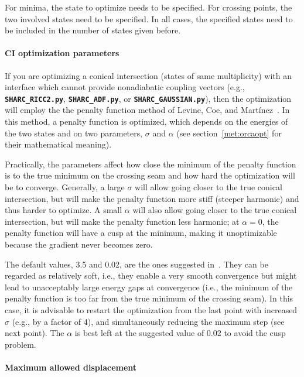 \documentclass[a4paper,10pt,DIV=15,openany]{scrbook}
\newcommand{\ttt}[1]{\textbf{\texttt{#1}}}
\begin{document}
For minima, the state to optimize needs to be specified.
For crossing points, the two involved states need to be specified.
In all cases, the specified states need to be included in the number of states given before.

\paragraph{CI optimization parameters}

If you are optimizing a conical intersection (states of same multiplicity) with an interface which cannot provide nonadiabatic coupling vectors (e.g., \ttt{SHARC\_RICC2.py}, \ttt{SHARC\_ADF.py}, or \ttt{SHARC\_GAUSSIAN.py}), then the optimization will employ the the penalty function method of Levine, Coe, and Mart\'inez~\cite{Levine2008JPCB}.
In this method, a penalty function is optimized, which depends on the energies of the two states and on two parameters, $\sigma$ and $\alpha$ (see section~\ref{met:orcaopt} for their mathematical meaning).

Practically, the parameters affect how close the minimum of the penalty function is to the true minimum on the crossing seam and how hard the optimization will be to converge.
Generally, a large $\sigma$ will allow going closer to the true conical intersection, but will make the penalty function more stiff (steeper harmonic) and thus harder to optimize.
A small $\alpha$ will also allow going closer to the true conical intersection, but will make the penalty function less harmonic; at $\alpha=0$, the penalty function will have a cusp at the minimum, making it unoptimizable because the gradient never becomes zero.

The default values, 3.5 and 0.02, are the ones suggested in~\cite{Levine2008JPCB}.
They can be regarded as relatively soft, i.e., they enable a very smooth convergence but might lead to unacceptably large energy gaps at convergence (i.e., the minimum of the penalty function is too far from the true minimum of the crossing seam).
In this case, it is advisable to restart the optimization from the last point with increased $\sigma$ (e.g., by a factor of 4), and simultaneously reducing the maximum step (see next point).
The $\alpha$ is best left at the suggested value of 0.02 to avoid the cusp problem.

\paragraph{Maximum allowed displacement}
\end{document}
